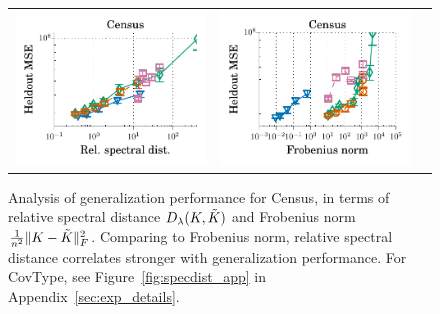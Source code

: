 \begin{figure}
\begin{tabular}{@{\hskip -0.1in}c@{\hskip -0.1in}c@{\hskip -0.1in}c@{\hskip -0.1in}}
		\includegraphics[width=0.33\linewidth]{figures/regression_l2_vs_delta.pdf} &
		\includegraphics[width=0.33\linewidth]{figures/regression_l2_vs_f_norm.pdf} %
	\end{tabular}
	\caption{Analysis of generalization performance for Census, in terms of relative spectral distance $D_{\lambda}(K,\tilde{K})$ and Frobenius norm $\frac{1}{n^2}\|K-\tilde{K}\|_F^2$. Comparing to Frobenius norm, relative spectral distance correlates stronger with generalization performance. For CovType, see Figure~\ref{fig:specdist_app} in Appendix~\ref{sec:exp_details}.
	}
	\label{fig:specdist}
\end{figure}

